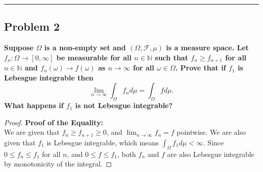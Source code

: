 \documentclass[11pt]{article}
\begin{document}
\vspace{1em}
\hrule
\vspace{1em}

\subsection*{Problem 2}
\textbf{Suppose $\Omega$ is a non-empty set and $(\Omega, \mathcal{F}, \mu)$ is a measure space. Let $f_n: \Omega \to [0, \infty]$ be measurable for all $n \in \mathbb{N}$ such that $f_n \ge f_{n+1}$ for all $n \in \mathbb{N}$ and $f_n(\omega) \to f(\omega)$ as $n \to \infty$ for all $\omega \in \Omega$. Prove that if $f_1$ is Lebesgue integrable then}
\[ \lim_{n\to\infty} \int_\Omega f_n d\mu = \int_\Omega f d\mu. \]
\textbf{What happens if $f_1$ is not Lebesgue integrable?}

\begin{proof}
\textbf{Proof of the Equality:} \\
We are given that $f_n \ge f_{n+1} \ge 0$, and $\lim_{n \to \infty} f_n = f$ pointwise. We are also given that $f_1$ is Lebesgue integrable, which means $\int_\Omega f_1 d\mu < \infty$.
Since $0 \le f_n \le f_1$ for all $n$, and $0 \le f \le f_1$, both $f_n$ and $f$ are also Lebesgue integrable by monotonicity of the integral. 


\end{proof}
\end{document}
